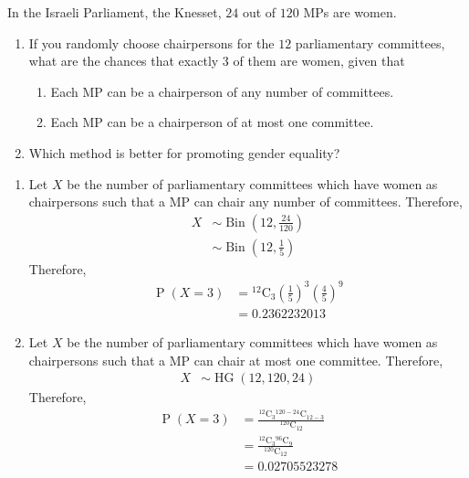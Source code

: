 \documentclass[fleqn, a4paper, 11pt, oneside]{amsart}
\theoremstyle{definition}
\theoremstyle{theorem}
\DeclareMathOperator{\prob}{\mathrm{P}}
\DeclareMathOperator{\bin}{\mathrm{Bin}}
\DeclareMathOperator{\hg}{\mathrm{HG}}
\newcommand*{\comb}[2]{{}^{#1}\mathrm{C}_{#2}}%
\begin{document}
\begin{question}
	In the Israeli Parliament, the Knesset, $24$ out of $120$ MPs are women.
	\begin{enumerate}
		\item
			If you randomly choose chairpersons for the $12$ parliamentary committees, what are the chances that exactly $3$ of them are women, given that
			\begin{enumerate}
				\item Each MP can be a chairperson of any number of committees.
				\item Each MP can be a chairperson of at most one committee.
			\end{enumerate}
		\item
			Which method is better for promoting gender equality?
	\end{enumerate}
\end{question}

\begin{solution}
	\begin{enumerate}[leftmargin=*]
		\item
			Let $X$ be the number of parliamentary committees which have women as chairpersons such that a MP can chair any number of committees.
			Therefore,
			\begin{align*}
				X &\sim \bin\left( 12,\frac{24}{120} \right)\\
				&\sim \bin\left( 12,\frac{1}{5} \right)
			\end{align*}
			Therefore,
			\begin{align*}
				\prob(X = 3) &= \comb{12}{3} \left( \frac{1}{5} \right)^3 \left( \frac{4}{5} \right)^9\\
				&= 0.2362232013
			\end{align*}
		\item
			Let $X$ be the number of parliamentary committees which have women as chairpersons such that a MP can chair at most one committee.
			Therefore,
			\begin{align*}
				X &\sim \hg\left( 12,120,24 \right)
			\end{align*}
			Therefore,
			\begin{align*}
				\prob(X = 3) &= \frac{\comb{12}{3} \comb{120 - 24}{12 - 3}}{\comb{120}{12}}\\
				&= \frac{\comb{12}{3} \comb{96}{9}}{\comb{120}{12}}\\
				&= 0.02705523278
			\end{align*}
	\end{enumerate}
\end{solution}
\end{document}
